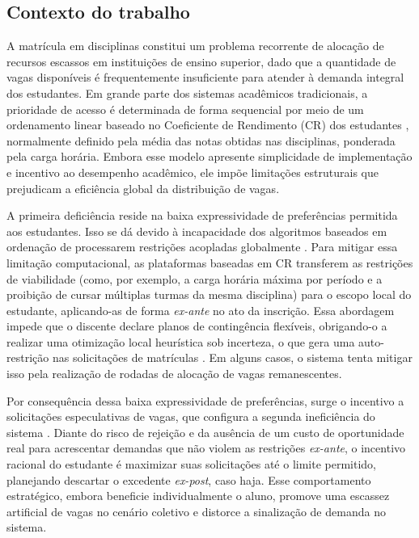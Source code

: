 \documentclass[
    12pt,
    openany,
    oneside,
    a4paper,
    english,
    brazil
]{abntex2}
\begin{document}
\subsection{Contexto do trabalho}

A matrícula em disciplinas constitui um problema recorrente de alocação de recursos escassos em instituições de ensino superior, dado que a quantidade de vagas disponíveis é frequentemente insuficiente para atender à demanda integral dos estudantes. Em grande parte dos sistemas acadêmicos tradicionais, a prioridade de acesso é determinada de forma sequencial por meio de um ordenamento linear baseado no Coeficiente de Rendimento (CR) dos estudantes \cite{sonmez2011}, normalmente definido pela média das notas obtidas nas disciplinas, ponderada pela carga horária. Embora esse modelo apresente simplicidade de implementação e incentivo ao desempenho acadêmico, ele impõe limitações estruturais que prejudicam a eficiência global da distribuição de vagas.

A primeira deficiência reside na baixa expressividade de preferências permitida aos estudantes. Isso se dá devido à incapacidade dos algoritmos baseados em ordenação de processarem restrições acopladas globalmente \cite{kellerer2004}. Para mitigar essa limitação computacional, as plataformas baseadas em CR transferem as restrições de viabilidade (como, por exemplo, a carga horária máxima por período e a proibição de cursar múltiplas turmas da mesma disciplina) para o escopo local do estudante, aplicando-as de forma \textit{ex-ante} no ato da inscrição. Essa abordagem impede que o discente declare planos de contingência flexíveis, obrigando-o a realizar uma otimização local heurística sob incerteza, o que gera uma auto-restrição nas solicitações de matrículas \cite{sonmez2011}. Em alguns casos, o sistema tenta mitigar isso pela realização de rodadas de alocação de vagas remanescentes.

Por consequência dessa baixa expressividade de preferências, surge o incentivo a solicitações especulativas de vagas, que configura a segunda ineficiência do sistema \cite{sonmez2011}. Diante do risco de rejeição e da ausência de um custo de oportunidade real para acrescentar demandas que não violem as restrições \textit{ex-ante}, o incentivo racional do estudante é maximizar suas solicitações até o limite permitido, planejando descartar o excedente \textit{ex-post}, caso haja. Esse comportamento estratégico, embora beneficie individualmente o aluno, promove uma escassez artificial de vagas no cenário coletivo e distorce a sinalização de demanda no sistema.
\end{document}
